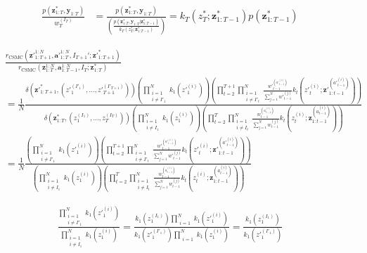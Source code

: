 \documentclass[11pt]{article}
\newcommand{\z}{\mathbf{z}}
\newcommand{\abold}{\mathbf{a}}
\newcommand{\y}{\mathbf{y}}
\begin{document}
\begin{align*}
\frac{p({\z}_{1:T}^*, \y_{1:T})}{{w}_{T}^{(I_{T})}}
    &= \frac{p({\z}_{1:T}^*, \y_{1:T})}
            {\left(\frac{p({\z}_{1:T}^*, \y_{1:T} | {\z}_{1:T-1}^*)}{k_{T}({z}_{T}^{*}; {\z}_{1:T-1}^{*})}\right)}
    = k_{T}({z}_{T}^{*}; {\z}_{1:T-1}^{*}) p({\z}_{1:T-1}^*)
\end{align*}

\begin{align*}
& \frac{r_{\mathrm{CSMC}}({\z'}_{1:T+1}^{1:N}, {\abold'}_{1:T}^{1:N}, I_{T+1}'; {\z'}_{1:T+1}^*)}
{r_{\mathrm{CSMC}}(\z_{1:T}^{1:N}, \abold_{1:T-1}^{1:N}, I_T; \z_{1:T}^*)}\\
&= \frac{1}{N} \frac{
\delta({\z'}_{1:T+1}^*,  ({z'}_1^{(I'_1)}, \ldots, {z'}_{T+1}^{(I'_{T+1})}))
        \left( \prod_{\substack{i=1\\i \ne I'_1}}^N k_1({z'}_1^{(i)}) \right)
        \left( \prod_{t=2}^{T+1} \prod_{\substack{i=1\\i \ne I'_t}}^N \frac{{w'}_{t-1}^{({a'}_{t-1}^{(i)})}}{\sum_{j=1}^N {w'}_{t-1}^{(j)}} k_t({z'}_t^{(i)}; {\z'}_{1:t-1}^{({a'}_{t-1}^{(i)})} )\right)
}
{
\delta(\z_{1:T}^*,  (z_1^{(I_1)}, \ldots, z_T^{(I_T)}))
        \left( \prod_{\substack{i=1\\i \ne I_1}}^N k_1(z_1^{(i)}) \right)
        \left( \prod_{t=2}^T \prod_{\substack{i=1\\i \ne I_t}}^N \frac{w_{t-1}^{(a_{t-1}^{(i)})}}{\sum_{j=1}^N w_{t-1}^{(j)}} k_t(z_t^{(i)}; \z_{1:t-1}^{(a_{t-1}^{(i)})} )\right)
}\\
&= \frac{1}{N} \frac{
        \left( \prod_{\substack{i=1\\i \ne I'_1}}^N k_1({z'}_1^{(i)}) \right)
        \left( \prod_{t=2}^{T+1} \prod_{\substack{i=1\\i \ne I'_t}}^N \frac{{w'}_{t-1}^{({a'}_{t-1}^{(i)})}}{\sum_{j=1}^N {w'}_{t-1}^{(j)}} k_t({z'}_t^{(i)}; {\z'}_{1:t-1}^{({a'}_{t-1}^{(i)})} )\right)
}{
        \left( \prod_{\substack{i=1\\i \ne I_1}}^N k_1(z_1^{(i)}) \right)
        \left( \prod_{t=2}^T \prod_{\substack{i=1\\i \ne I_t}}^N \frac{w_{t-1}^{(a_{t-1}^{(i)})}}{\sum_{j=1}^N w_{t-1}^{(j)}} k_t(z_t^{(i)}; \z_{1:t-1}^{(a_{t-1}^{(i)})} )\right)
}
\end{align*}

\begin{align*}
\frac{
    \prod_{\substack{i=1\\i \ne I'_1}}^N k_1({z'}_1^{(i)})
}{
    \prod_{\substack{i=1\\i \ne I_1}}^N k_1(z_1^{(i)})
} =
\frac{
    k_1(z_1^{(I_1)}) \prod_{\substack{i=1}}^N k_1({z'}_1^{(i)})
}{
    k_1({z'}_1^{(I'_1)}) \prod_{\substack{i=1}}^N k_1(z_1^{(i)})
} =
\frac{
k_1(z_1^{(I_1)}) 
}{
k_1({z'}_1^{(I'_1)})
}
\end{align*}
\end{document}
